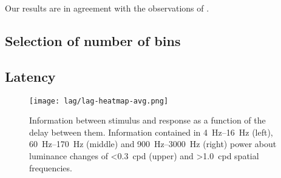 Our results are in agreement with the observations of \citet[Figure 5B]{Maier2010}.

\subsection{Selection of number of bins}


\subsection{Latency}

%
%
%
%
%

\begin{figure}[htb]
    \centering
    \texttt{[image: lag/lag-heatmap-avg.png]}
    \caption{
Information between stimulus and response as a function of the delay between them.
Information contained in \SIrange{4}{16}{Hz} (left), \SIrange{60}{170}{Hz} (middle) and \SIrange{900}{3000}{Hz} (right) power about luminance changes of \SI{<0.3}{cpd} (upper) and \SI{>1.0}{cpd} spatial frequencies.
}
\label{fig:lam_lag_hm}
\end{figure}


\begin{figure}[htb]
    \centering
    \hspace*{\fill}
    \hspace*{\fill}\hspace{.2cm}\hspace*{\fill}
    \hspace*{\fill}
    \caption{
}
\label{fig:lam_lag}
\end{figure}


